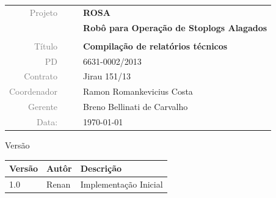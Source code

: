 \vspace{4cm}

\begin{table}[ht!]
	\centering
	\begin{tabular}{r l|l p{12cm} }
		\textcolor{gray}{Projeto} &&& \textbf{\Large ROSA}\\
			&&& \textbf{Robô para Operação de Stoplogs Alagados}\\
			&&& \\
		\textcolor{gray}{Título} &&& \textbf{Compilação de relatórios técnicos}\\
		\textcolor{gray}{PD} &&& 6631-0002/2013 \\
		\textcolor{gray}{Contrato} &&& Jirau 151/13\\
		\textcolor{gray}{Coordenador} &&& Ramon Romankevicius Costa \\
		\textcolor{gray}{Gerente} &&& Breno Bellinati de Carvalho \\
		\textcolor{gray}{Data:} &&& \today \\
	\end{tabular}
\end{table}


\cleardoublepage


\thispagestyle{empty}


\begin{center}

  
 \vfill



  {\LARGE Versão}
  \vspace{0.50cm}



  \begin{center}
    \begin{tabular}{| l | l | l |}
    \hline
   	 Versão 					& Autôr			 & Descrição 	 \\ \hline
   	 1.0 		& Renan  	& Implementação Inicial\\			
    
    \hline 
    \end{tabular}
\end{center}






\end{center}

\newpage

\hypersetup{pageanchor=true}

